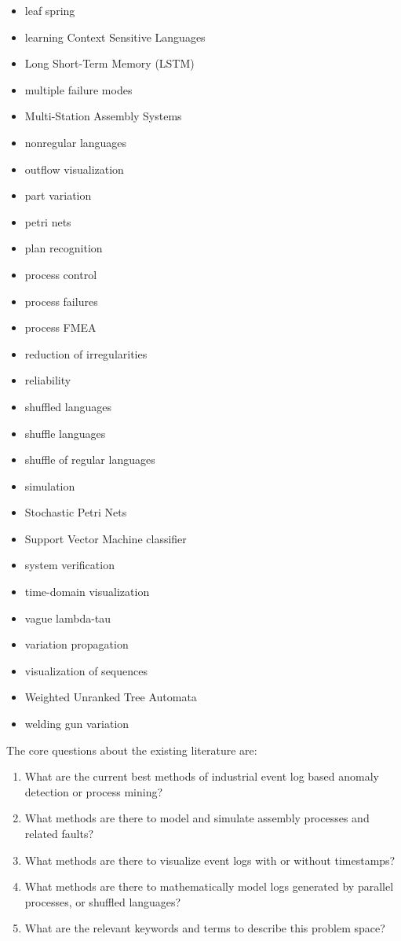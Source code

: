 \documentclass[a4paper,10pt]{article}
\begin{document}
\begin{itemize}
 \item leaf spring
 \item learning Context Sensitive Languages
 \item Long Short-Term Memory (LSTM)
 \item multiple failure modes
 \item Multi-Station Assembly Systems
 \item nonregular languages
 \item outflow visualization
 \item part variation
 \item petri nets
 \item plan recognition
 \item process control
 \item process failures
 \item process FMEA
 \item reduction of irregularities
 \item reliability
 \item shuffled languages
 \item shuffle languages
 \item shuffle of regular languages
 \item simulation
 \item Stochastic Petri Nets
 \item Support Vector Machine classifier
 \item system verification
 \item time-domain visualization
 \item vague lambda-tau
 \item variation propagation
 \item visualization of sequences
 \item Weighted Unranked Tree Automata
 \item welding gun variation
\end{itemize}

The core questions about the existing literature are:
\begin{enumerate}
 \item What are the current best methods of industrial event log based anomaly detection or process mining?
 \item What methods are there to model and simulate assembly processes and related faults?
 \item What methods are there to visualize event logs with or without timestamps?
 \item What methods are there to mathematically model logs generated by parallel processes, or shuffled languages?
 \item What are the relevant keywords and terms to describe this problem space?
\end{enumerate}
\end{document}
